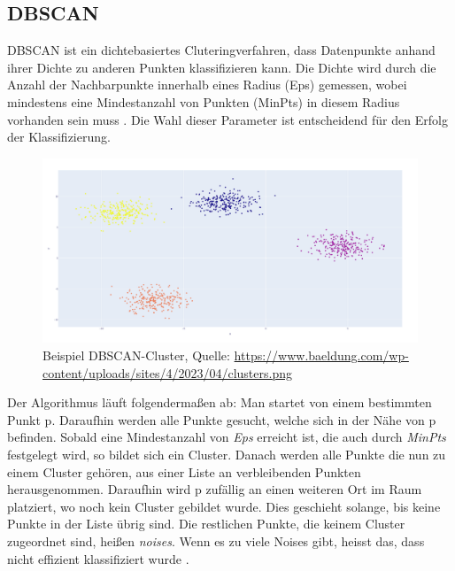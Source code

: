 \documentclass[a4paper,12pt]{article}
\begin{document}
	\subsection{DBSCAN}
	DBSCAN ist ein dichtebasiertes Cluteringverfahren, dass Datenpunkte anhand ihrer Dichte zu anderen Punkten klassifizieren kann.
	Die Dichte wird durch die Anzahl der Nachbarpunkte innerhalb eines Radius (Eps) gemessen, wobei mindestens eine Mindestanzahl von Punkten (MinPts) in diesem Radius vorhanden sein muss \cite{ester1996dbscan}. Die Wahl dieser Parameter ist entscheidend für den Erfolg der Klassifizierung.
	
	\begin{figure}[H]
		\centering
		\includegraphics[width=0.9\linewidth]{screenshot015}
		\caption{Beispiel DBSCAN-Cluster, Quelle: \url{https://www.baeldung.com/wp-content/uploads/sites/4/2023/04/clusters.png}}
		\label{fig:screenshot015}
	\end{figure}
	
	Der Algorithmus läuft folgendermaßen ab:
	Man startet von einem bestimmten Punkt p. Daraufhin werden alle Punkte gesucht, welche sich in der Nähe von p befinden. Sobald eine Mindestanzahl von \textit{Eps} erreicht ist, die auch durch \textit{MinPts} festgelegt wird, so bildet sich ein Cluster. Danach werden alle Punkte die nun zu einem Cluster gehören, aus einer Liste an verbleibenden Punkten herausgenommen. Daraufhin wird p zufällig an einen weiteren Ort im Raum platziert, wo noch kein Cluster gebildet wurde. Dies geschieht solange, bis keine Punkte in der Liste übrig sind. Die restlichen Punkte, die keinem Cluster zugeordnet sind, heißen \textit{\gls{noise}s}. Wenn es zu viele Noises gibt, heisst das, dass nicht effizient klassifiziert wurde \cite{ester1996dbscan}. 
	
\end{document}
